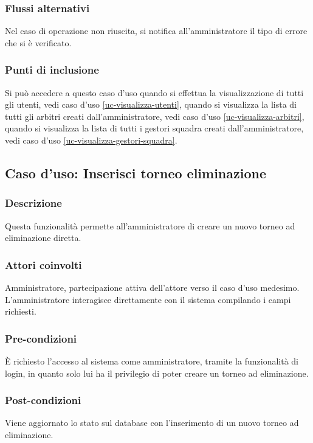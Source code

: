 \subsubsection*{Flussi alternativi}
Nel caso di operazione non riuscita, si notifica all'amministratore il tipo di errore che si è verificato.

\subsubsection*{Punti di inclusione}
Si può accedere a questo caso d'uso quando si effettua la visualizzazione di tutti gli utenti, vedi caso d'uso \vref{uc-visualizza-utenti}, quando si visualizza la lista di tutti gli arbitri creati dall'amministratore, vedi caso d'uso \vref{uc-visualizza-arbitri}, quando si visualizza la lista di tutti i gestori squadra creati dall'amministratore, vedi caso d'uso \vref{uc-visualizza-gestori-squadra}.


%
%
\subsection{Caso d'uso: Inserisci torneo eliminazione}

\subsubsection*{Descrizione}
Questa funzionalità permette all'amministratore di creare un nuovo torneo ad eliminazione diretta.

\subsubsection*{Attori coinvolti}
Amministratore, partecipazione attiva dell'attore verso il caso d'uso medesimo.
L'amministratore interagisce direttamente con il sistema compilando i campi richiesti.

\subsubsection*{Pre-condizioni}
È richiesto l'accesso al sistema come amministratore, tramite la funzionalità di login, in quanto solo lui ha il privilegio di poter creare un torneo ad eliminazione.

\subsubsection*{Post-condizioni}
Viene aggiornato lo stato sul database con l'inserimento di un nuovo torneo ad eliminazione.

